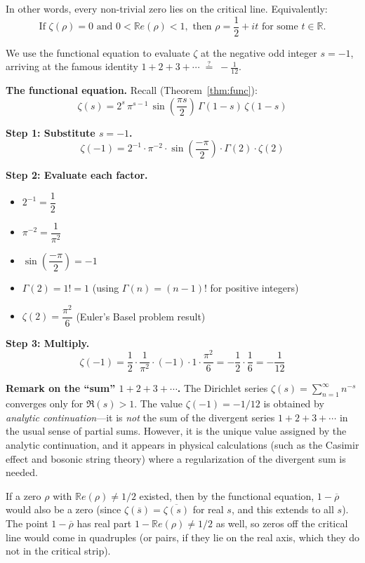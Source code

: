 In other words, every non-trivial zero lies on the critical line. Equivalently:
\[
\text{If } \zeta(\rho) = 0 \text{ and } 0 < \mathbb{R}e(\rho) < 1, \text{ then } \rho = \frac{1}{2} + it \text{ for some } t \in \mathbb{R}.
\]

\begin{example}[Computing $\zeta(-1) = -\tfrac{1}{12}$ via the functional equation]
\label{ex:zeta_neg1_worked}
We use the functional equation to evaluate $\zeta$ at the negative odd integer $s = -1$, arriving at the famous identity $1 + 2 + 3 + \cdots \;\overset{?}{=}\; -\tfrac{1}{12}$.

\textbf{The functional equation.} Recall (Theorem~\ref{thm:func}):
\[
\zeta(s) = 2^s \, \pi^{s-1} \, \sin\!\left(\frac{\pi s}{2}\right) \, \Gamma(1 - s) \, \zeta(1 - s)
\]

\textbf{Step 1: Substitute $s = -1$.}
\[
\zeta(-1) = 2^{-1} \cdot \pi^{-2} \cdot \sin\!\left(\frac{-\pi}{2}\right) \cdot \Gamma(2) \cdot \zeta(2)
\]

\textbf{Step 2: Evaluate each factor.}
\begin{itemize}
  \item $2^{-1} = \dfrac{1}{2}$
  \item $\pi^{-2} = \dfrac{1}{\pi^2}$
  \item $\sin\!\left(\dfrac{-\pi}{2}\right) = -1$
  \item $\Gamma(2) = 1! = 1$ \quad (using $\Gamma(n) = (n-1)!$ for positive integers)
  \item $\zeta(2) = \dfrac{\pi^2}{6}$ \quad (Euler's Basel problem result)
\end{itemize}

\textbf{Step 3: Multiply.}
\[
\zeta(-1) = \frac{1}{2} \cdot \frac{1}{\pi^2} \cdot (-1) \cdot 1 \cdot \frac{\pi^2}{6} = -\frac{1}{2} \cdot \frac{1}{6} = -\frac{1}{12}
\]

\textbf{Remark on the ``sum'' $1 + 2 + 3 + \cdots$.}
The Dirichlet series $\zeta(s) = \sum_{n=1}^{\infty} n^{-s}$ converges only for $\Re(s) > 1$. The value $\zeta(-1) = -1/12$ is obtained by \emph{analytic continuation}---it is \emph{not} the sum of the divergent series $1 + 2 + 3 + \cdots$ in the usual sense of partial sums. However, it is the unique value assigned by the analytic continuation, and it appears in physical calculations (such as the Casimir effect and bosonic string theory) where a regularization of the divergent sum is needed.
\end{example}

\begin{remark}
If a zero $\rho$ with $\mathbb{R}e(\rho) \neq 1/2$ existed, then by the functional equation, $1 - \overline{\rho}$ would also be a zero (since $\zeta(\overline{s}) = \overline{\zeta(s)}$ for real $s$, and this extends to all $s$). The point $1 - \overline{\rho}$ has real part $1 - \mathbb{R}e(\rho) \neq 1/2$ as well, so zeros off the critical line would come in quadruples (or pairs, if they lie on the real axis, which they do not in the critical strip).
\end{remark}

